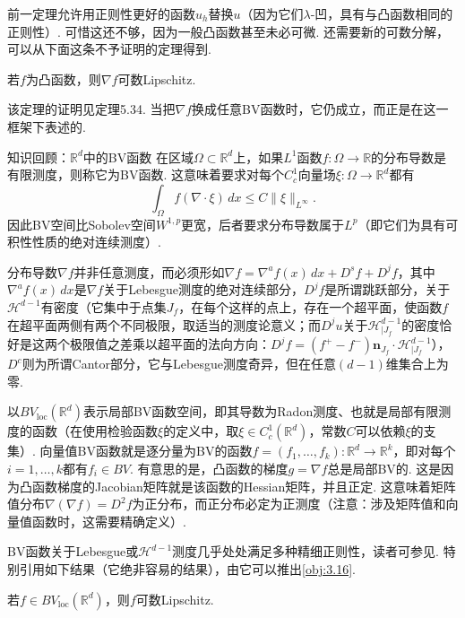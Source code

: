 前一定理允许用正则性更好的函数$u_h$替换$u$（因为它们$\lambda$-凹，具有与凸函数相同的正则性）. 可惜这还不够，因为一般凸函数甚至未必可微. 还需要新的可数分解，可以从下面这条不予证明的定理得到.

\begin{theorem}\label{obj:3.16}
若$f$为凸函数，则$\nabla f$可数Lipschitz.
\end{theorem}
该定理的证明见\cite{b13}定理5.34. 当把$\nabla f$换成任意BV函数时，它仍成立，而\cite{b13}正是在这一框架下表述的.

\begin{sourcebox}{知识回顾：$\mathbb R^d$中的BV函数}\label{box:3.1}
在区域$\Omega\subset\mathbb R^d$上，如果$L^1$函数$f:\Omega\to\mathbb R$的分布导数是有限测度，则称它为BV函数. 这意味着要求对每个$C_c^1$向量场$\xi:\Omega\to\mathbb R^d$都有
\[
\int_\Omega f(\nabla\cdot\xi)\,dx\le C\|\xi\|_{L^\infty}.
\]
因此BV空间比Sobolev空间$W^{1,p}$更宽，后者要求分布导数属于$L^p$（即它们为具有可积性性质的绝对连续测度）.

分布导数$\nabla f$并非任意测度，而必须形如$\nabla f=\nabla^af(x)\,dx+D^sf+D^jf$，其中$\nabla^af(x)\,dx$是$\nabla f$关于Lebesgue测度的绝对连续部分，$D^jf$是所谓跳跃部分，关于$\mathscr H^{d-1}$有密度（它集中于点集$J_f$，在每个这样的点上，存在一个超平面，使函数$f$在超平面两侧有两个不同极限，取适当的测度论意义；而$D^ju$关于$\mathscr H^{d-1}_{|J_f}$的密度恰好是这两个极限值之差乘以超平面的法向方向：$D^jf=(f^+-f^-)\mathbf n_{J_f}\cdot\mathscr H^{d-1}_{|J_f}$），$D^c$则为所谓Cantor部分，它与Lebesgue测度奇异，但在任意$(d-1)$维集合上为零.

以$BV_{\mathrm{loc}}(\mathbb R^d)$表示局部BV函数空间，即其导数为Radon测度、也就是局部有限测度的函数（在使用检验函数$\xi$的定义中，取$\xi\in C_c^1(\mathbb R^d)$，常数$C$可以依赖$\xi$的支集）. 向量值BV函数就是逐分量为BV的函数$f=(f_1,\ldots,f_k):\mathbb R^d\to\mathbb R^k$，即对每个$i=1,\ldots,k$都有$f_i\in BV$. 有意思的是，凸函数的梯度$g=\nabla f$总是局部BV的. 这是因为凸函数梯度的Jacobian矩阵就是该函数的Hessian矩阵，并且正定. 这意味着矩阵值分布$\nabla(\nabla f)=D^2f$为正分布，而正分布必定为正测度（注意：涉及矩阵值和向量值函数时，这需要精确定义）.

BV函数关于Lebesgue或$\mathscr H^{d-1}$测度几乎处处满足多种精细正则性，读者可参见\cite{b13,b160}. 特别引用如下结果（它绝非容易的结果），由它可以推出\autoref{obj:3.16}.
\begin{theorem*}
若$f\in BV_{\mathrm{loc}}(\mathbb R^d)$，则$f$可数Lipschitz.
\end{theorem*}
\end{sourcebox}

